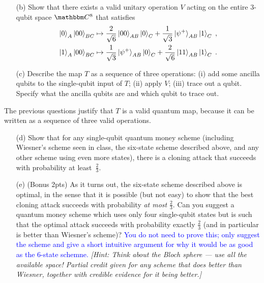 \documentclass[12pt]{article}
\begin{document}
\begin{enumerate}
\begin{enumerate}
\item[(b)] Show that there exists a valid unitary operation $V$ acting on the entire $3$-qubit space $\C^8$ that satisfies 
\begin{align*}
\ket{0}_A \ket{00}_{BC} \mapsto \frac{2}{\sqrt{6}}\ket{00}_{AB}\ket{0}_C + \frac{1}{\sqrt{3}} \ket{\psi^+}_{AB} \ket{1}_C \;,\\
\ket{1}_A \ket{00}_{BC} \mapsto  \frac{1}{\sqrt{3}} \ket{\psi^+}_{AB}\ket{0}_C + \frac{2}{\sqrt{6}}\ket{11}_{AB}\ket{1}_C \;.
\end{align*}
\item[(c)] Describe the map $T$  as a sequence of three operations: (i) add some ancilla qubits to the single-qubit input of $T$; (ii) apply $V$; (iii) trace out a qubit. Specify what the ancilla qubits are and which qubit to trace out.
\end{enumerate}
The previous questions justify that $T$ is a valid quantum map, because it can be written as a sequence of three valid operations.
\begin{enumerate}
\item[(d)] Show that for any single-qubit quantum money scheme (including Wiesner's scheme seen in class, the six-state scheme described above, and any other scheme using even more states), there is a cloning attack that succeeds with probability at least~$\frac{2}{3}$. 
\item[(e)] (Bonus 2pts) As it turns out, the six-state scheme described above is optimal, in the sense that it is possible (but not easy) to show that the best cloning attack succeeds with probability \emph{at most} $\frac{2}{3}$. Can you suggest a quantum money scheme which uses only four single-qubit states but is such that the optimal attack succeeds with probability exactly $\frac{2}{3}$ (and in particular is better than Wiesner's scheme)? \textcolor{blue}{You do not need to prove this; only suggest the scheme and give a short intuitive argument for why it would be as good as the $6$-state schemne.} {\em [Hint: Think about the Bloch sphere --- use all the available space! Partial credit given for any scheme that does better than Wiesner, together with credible evidence for it being better.]} 
\end{enumerate}


\end{enumerate}
\end{document}
